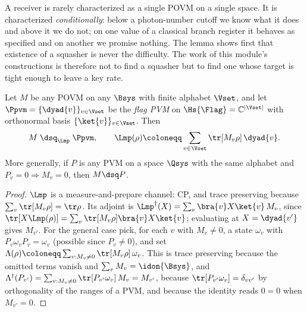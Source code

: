 
A receiver is rarely characterized as a single POVM on a single space. It is
characterized \emph{conditionally}: below a photon-number cutoff we know what
it does and above it we do not; on one value of a classical branch register it
behaves as specified and on another we promise nothing. The lemma shows first
that existence of a squasher is never the difficulty. The work of this
module's constructions is therefore not to find a squasher but to find one
whose target is tight enough to leave a key rate.

\begin{lemma}\label{lem:top}
Let $M$ be any POVM on any $\Bsys$ with finite alphabet $\Vset$, and let
$\Ppvm=\{\dyad{v}\}_{v\in\Vset}$ be the \emph{flag PVM} on
$\Hs{\Flag}=\mathbb{C}^{|\Vset|}$ with orthonormal basis
$\{\ket{v}\}_{v\in\Vset}$. Then
\begin{equation}\label{eq:mpsquasher}
  M\;\dsq_{\Lmp}\;\Ppvm,
  \qquad
  \Lmp(\rho)\coloneqq\sum_{v\in\Vset}\tr[M_v\rho]\,\dyad{v} .
\end{equation}
More generally, if $P$ is any PVM on a space $\Qsys$ with the same alphabet and
$P_v=0\Rightarrow M_v=0$, then $M\dsq P$.
\end{lemma}

\begin{proof}
$\Lmp$ is a measure-and-prepare channel: CP, and trace preserving because
$\sum_v\tr[M_v\rho]=\tr\rho$. Its adjoint is
$\Lmp^{\dagger}(X)=\sum_v\bra{v}X\ket{v}\,M_v$, since
$\tr[X\Lmp(\rho)]=\sum_v\tr[M_v\rho]\bra{v}X\ket{v}$; evaluating at
$X=\dyad{v'}$ gives $M_{v'}$. For the general case pick, for each $v$ with
$M_v\neq0$, a state $\omega_v$ with $P_v\omega_vP_v=\omega_v$ (possible since
$P_v\neq0$), and set
$\Lambda(\rho)\coloneqq\sum_{v:M_v\neq0}\tr[M_v\rho]\,\omega_v$. This is trace
preserving because the omitted terms vanish and $\sum_vM_v=\idon{\Bsys}$, and
$\Lambda^{\dagger}(P_{v'})=\sum_{v:M_v\neq0}\tr[P_{v'}\omega_v]\,M_v=M_{v'}$,
because $\tr[P_{v'}\omega_v]=\delta_{vv'}$ by orthogonality of the ranges of a
PVM, and because the identity reads $0=0$ when $M_{v'}=0$.
\end{proof}
